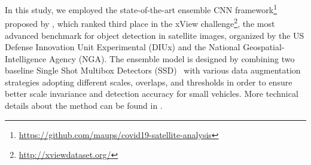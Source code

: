 \documentclass[sn-basic]{sn-jnl}%
\begin{document}

In this study, we employed the state-of-the-art ensemble CNN framework\footnote{\url{https://github.com/maups/covid19-satellite-analysis}} proposed by \citet{Minetto_et_al_2020}, which ranked third place in the xView challenge\footnote{\url{http://xviewdataset.org/}}, the most advanced benchmark for object detection in satellite images, organized by the US Defense Innovation Unit Experimental (DIUx) and the National Geospatial-Intelligence Agency (NGA). 
The ensemble model is designed by combining two baseline Single Shot Multibox Detectors (SSD)~\citep{Liu_et_al_2016} with various data augmentation strategies adopting different scales, overlaps, and thresholds in order to ensure better scale invariance and detection accuracy for small vehicles. More technical details about the method can be found in \cite{Minetto_et_al_2020}. 
\end{document}
